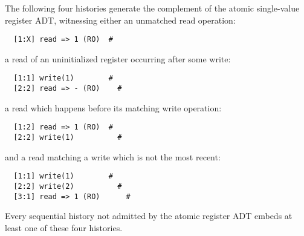 \begin{example}
  \label{ex:patterns}

  The following four histories generate the complement of the atomic
  single-value register ADT, witnessing either an unmatched read operation:
\begin{verbatim}
  [1:X] read => 1 (RO)  #
\end{verbatim}
  a read of an uninitialized register occurring after some write:
\begin{verbatim}
  [1:1] write(1)        #
  [2:2] read => - (RO)    #
\end{verbatim}
  a read which happens before its matching write operation:
\begin{verbatim}
  [1:2] read => 1 (RO)  #
  [2:2] write(1)          #
\end{verbatim}
  and a read matching a write which is not the most recent:
\begin{verbatim}
  [1:1] write(1)        #
  [2:2] write(2)          #
  [3:1] read => 1 (RO)      #
\end{verbatim}
  Every sequential history not admitted by the atomic register ADT embeds at
  least one of these four histories.

\end{example}
